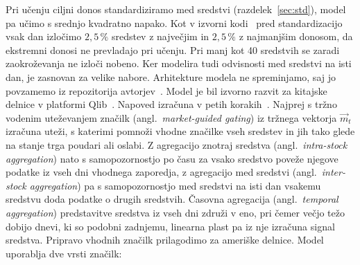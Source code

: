 \documentclass[9pt]{style/friteza}
\begin{document}
Pri učenju ciljni donos standardiziramo med sredstvi (razdelek~\ref{sec:std}), model pa učimo s srednjo kvadratno napako. Kot v izvorni kodi~\cite{li2024master_code} pred standardizacijo vsak dan izločimo $2{,}5\,\%$ sredstev z največjim in $2{,}5\,\%$ z najmanjšim donosom, da ekstremni donosi ne prevladajo pri učenju. Pri manj kot 40 sredstvih se zaradi zaokroževanja ne izloči nobeno. Ker modelira tudi odvisnosti med sredstvi na isti dan, je zasnovan za velike nabore. Arhitekture modela ne spreminjamo, saj jo povzamemo iz repozitorija avtorjev~\cite{li2024master_code}. Model je bil izvorno razvit za kitajske delnice v platformi Qlib~\cite{yang2020qlib}. Napoved izračuna v petih korakih~\cite{li2024master}. Najprej s tržno vodenim uteževanjem značilk (angl.\ \emph{market-guided gating}) iz tržnega vektorja $\vec{m}_t$ izračuna uteži, s katerimi pomnoži vhodne značilke vseh sredstev in jih tako glede na stanje trga poudari ali oslabi. Z agregacijo znotraj sredstva (angl.\ \emph{intra-stock aggregation}) nato s samopozornostjo po času za vsako sredstvo poveže njegove podatke iz vseh dni vhodnega zaporedja, z agregacijo med sredstvi (angl.\ \emph{inter-stock aggregation}) pa s samopozornostjo med sredstvi na isti dan vsakemu sredstvu doda podatke o drugih sredstvih. Časovna agregacija (angl.\ \emph{temporal aggregation}) predstavitve sredstva iz vseh dni združi v eno, pri čemer večjo težo dobijo dnevi, ki so podobni zadnjemu, linearna plast pa iz nje izračuna signal sredstva. Pripravo vhodnih značilk prilagodimo za ameriške delnice. Model uporablja dve vrsti značilk:
\end{document}

